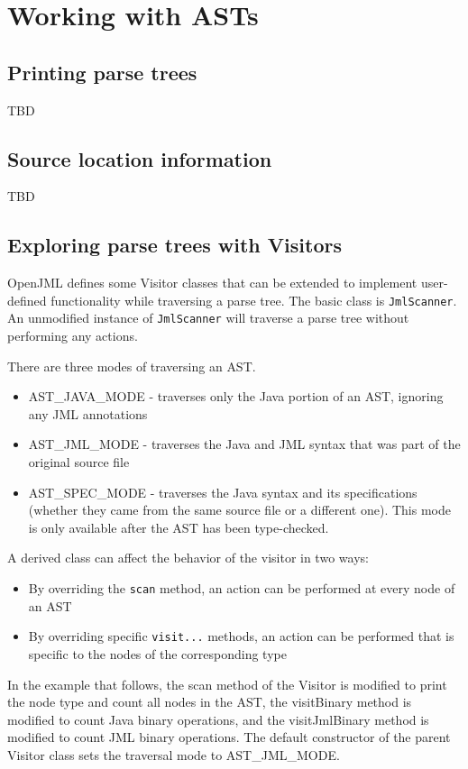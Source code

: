 \section{Working with ASTs}

\subsection{Printing parse trees}

TBD

\subsection{Source location information}

TBD

\subsection{Exploring parse trees with Visitors}
OpenJML defines some Visitor classes that can be extended to implement user-defined functionality while traversing a parse tree.
The basic class is {\tt JmlScanner}. An unmodified instance of {\tt JmlScanner} will traverse a parse tree without performing
any actions.

There are three modes of traversing an AST.
\begin{itemize}
\item AST\_JAVA\_MODE - traverses only the Java portion of an AST, ignoring any JML annotations
\item AST\_JML\_MODE - traverses the Java and JML syntax that was part of the original source file
\item AST\_SPEC\_MODE - traverses the Java syntax and its specifications (whether they came from the same source file or a different one). This mode is only available after the AST has been type-checked.
\end{itemize}

A derived class can affect the behavior of the visitor in two ways:
\begin{itemize}
\item By overriding the {\tt scan} method, an action can be performed at every node of an AST
\item By overriding specific {\tt visit...} methods, an action can be performed that is specific to the nodes of the corresponding type
\end{itemize}

In the example that follows, the scan method of the Visitor is modified to print the node type and count all nodes in the AST, the visitBinary method
is modified to count Java binary operations, and the visitJmlBinary method is modified to count JML binary operations.
The default constructor of the parent Visitor class sets the traversal mode to AST\_JML\_MODE.

